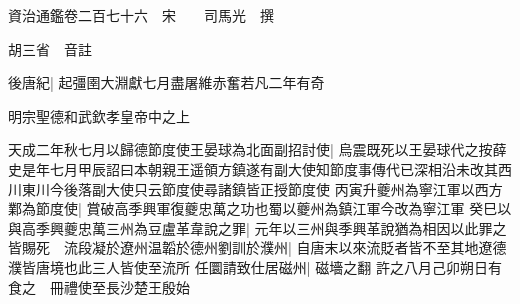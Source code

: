 資治通鑑卷二百七十六　宋　　司馬光　撰

胡三省　音註

後唐紀|{
	起彊圉大淵獻七月盡屠維赤奮若凡二年有奇}


明宗聖德和武欽孝皇帝中之上

天成二年秋七月以歸德節度使王晏球為北面副招討使|{
	烏震既死以王晏球代之按薛史是年七月甲辰詔曰本朝親王遥領方鎮遂有副大使知節度事傳代已深相沿未改其西川東川今後落副大使只云節度使尋諸鎮皆正授節度使}
丙寅升夔州為寧江軍以西方鄴為節度使|{
	賞破高季興軍復夔忠萬之功也蜀以夔州為鎮江軍今改為寧江軍}
癸巳以與高季興夔忠萬三州為豆盧革韋說之罪|{
	元年以三州與季興革說猶為相因以此罪之}
皆賜死　流段凝於遼州温韜於德州劉訓於濮州|{
	自唐末以來流貶者皆不至其地遼德濮皆唐境也此三人皆使至流所}
任圜請致仕居磁州|{
	磁墻之翻}
許之八月己卯朔日有食之　冊禮使至長沙楚王殷始

